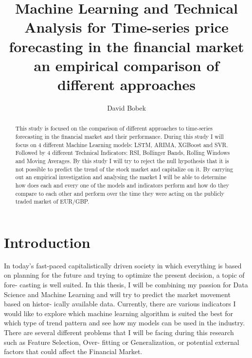 \documentclass{imc-inf}
\title{Machine Learning and Technical Analysis for Time-series price forecasting in the financial market an empirical comparison of different approaches}
\subtitle{}
\author{David Bobek}
\begin{document}
\frontmatter\maketitle{}


\begin{declarations}\end{declarations}



\begin{abstract}
	This study is focused on the comparison of different approaches to time-series forecasting in the financial market and their performance.
	During this study I will focus on 4 different Machine Learning models: LSTM, ARIMA, XGBoost and SVR. Followed by 4 different Technical Indicators: RSI, Bollinger Bands, Rolling Windows and Moving Averages.
	By this study I will try to reject the null hypothesis that it is not possible to predict the trend of the stock market and capitalize on it. By carrying out an empirical
	investigation and analysing the market I will be able to determine how does each and every one of the models and indicators perform and how do they compare to each other and perform 
	over the time they were acting on the publicly traded market of EUR/GBP.


\end{abstract}



%
\tableofcontents%
\clearpage


%
\listoftables
\clearpage


%
\listoffigures
\clearpage


\mainmatter%

\chapter{Introduction}\label{chap:introduction}

In today’s fast-paced capitalistically driven society in which everything is based on
planning for the future and trying to optimize the present decision, a topic of fore-
casting is well suited. In this thesis, I will be combining my passion for Data Science
and Machine Learning and will try to predict the market movement based on histor-
ically available data. Currently, there are various indicators I would like to explore
which machine learning algorithm is suited the best for which type of trend pattern
and see how my models can be used in the industry. There are several different
problems that I will be facing during this research such as Feature Selection, Over-
fitting or Generalization, or potential external factors that could affect the Financial Market.
\end{document}
